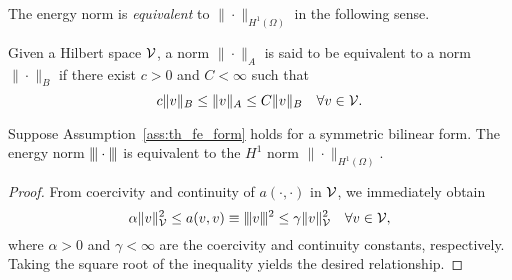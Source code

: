 The energy norm is \emph{equivalent} to $\| \cdot \|_{H^1(\Omega)}$ in the following sense.
\begin{definition}
  Given a Hilbert space $\mathcal{V}$, a norm $\| \cdot \|_A$ is said to be equivalent to a norm $\| \cdot \|_B$ if there exist $c > 0$ and $C < \infty$ such that
  \begin{equation*}
    c \| v \|_{B} \leq \| v \|_A \leq C \| v \|_{B} \quad \forall v \in \mathcal{V}.
  \end{equation*}
\end{definition}
\begin{lemma}
  Suppose Assumption~\ref{ass:th_fe_form} holds for a symmetric bilinear form.  The energy norm $|\kern-1pt|\kern-1pt| \cdot |\kern-1pt|\kern-1pt|$ is equivalent to the $H^1$ norm $\| \cdot \|_{H^1(\Omega)}$.
  \begin{proof}
    From coercivity and continuity of $a(\cdot,\cdot)$ in $\mathcal{V}$, we immediately obtain
    \begin{equation*}
      \alpha \| v \|_{\mathcal{V}}^2 \leq a(v,v) \equiv |\kern-1pt|\kern-1pt| v |\kern-1pt|\kern-1pt|^2 \leq \gamma \| v \|_{\mathcal{V}}^2 \quad \forall v \in \mathcal{V},
    \end{equation*}
    where $\alpha > 0$ and $\gamma < \infty$ are the coercivity and continuity constants, respectively. Taking the square root of the inequality yields the desired relationship.
  \end{proof}
\end{lemma}

